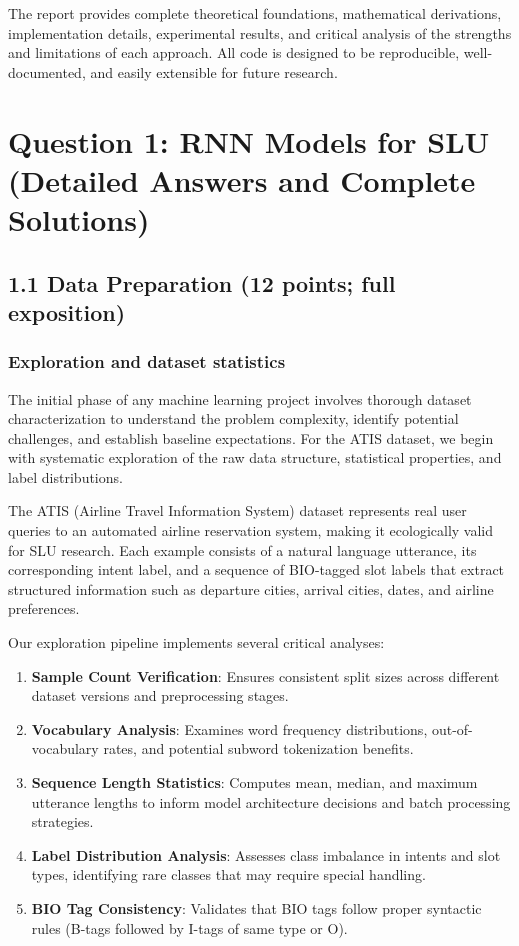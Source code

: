 \documentclass[conference]{IEEEtran}
\begin{document}
The report provides complete theoretical foundations, mathematical derivations, implementation details, experimental results, and critical analysis of the strengths and limitations of each approach. All code is designed to be reproducible, well-documented, and easily extensible for future research.

\section{Question 1: RNN Models for SLU (Detailed Answers and Complete Solutions)}
\subsection{1.1 Data Preparation (12 points; full exposition)}
\subsubsection{Exploration and dataset statistics}

The initial phase of any machine learning project involves thorough dataset characterization to understand the problem complexity, identify potential challenges, and establish baseline expectations. For the ATIS dataset, we begin with systematic exploration of the raw data structure, statistical properties, and label distributions.

The ATIS (Airline Travel Information System) dataset represents real user queries to an automated airline reservation system, making it ecologically valid for SLU research. Each example consists of a natural language utterance, its corresponding intent label, and a sequence of BIO-tagged slot labels that extract structured information such as departure cities, arrival cities, dates, and airline preferences.

Our exploration pipeline implements several critical analyses:
\begin{enumerate}
  \item \textbf{Sample Count Verification}: Ensures consistent split sizes across different dataset versions and preprocessing stages.
  \item \textbf{Vocabulary Analysis}: Examines word frequency distributions, out-of-vocabulary rates, and potential subword tokenization benefits.
  \item \textbf{Sequence Length Statistics}: Computes mean, median, and maximum utterance lengths to inform model architecture decisions and batch processing strategies.
  \item \textbf{Label Distribution Analysis}: Assesses class imbalance in intents and slot types, identifying rare classes that may require special handling.
  \item \textbf{BIO Tag Consistency}: Validates that BIO tags follow proper syntactic rules (B-tags followed by I-tags of same type or O).
\end{enumerate}
\end{document}
